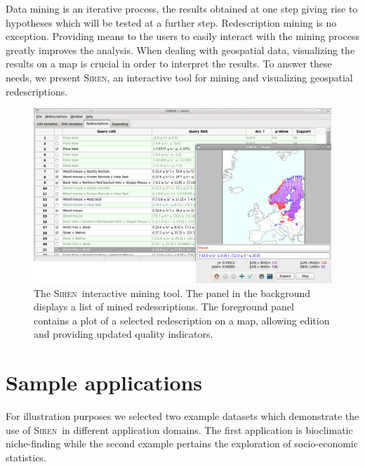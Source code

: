 \documentclass{sig-alternate}
\newcommand{\Siren}{\textsc{Siren}}
\begin{document}
Data mining is an iterative process, the results obtained at one step
giving rise to hypotheses which will be tested at a further step.
Redescription mining is no exception. Providing means to the users to
easily interact with the mining process greatly improves the analysis.
When dealing with geospatial data, visualizing the results on a map is
crucial in order to interpret the results.  To answer these needs, we
present \Siren, an interactive tool for mining and visualizing
geospatial redescriptions.



\begin{figure}[t]
  \centering
\includegraphics[width=\textwidth]{screenshots/both_panels_02.png}
  \caption{The \Siren\ interactive mining tool. The panel in the background displays a list of mined redescriptions. The foreground panel contains a plot of a selected redescription on a map, allowing edition and providing updated quality indicators.}
  \label{fig:both_panels}
\end{figure}

\section{Sample applications}
For illustration purposes we selected two example datasets which
demonstrate the use of \Siren\ in different application domains.  The
first application is bioclimatic niche-finding while the second example
pertains the exploration of socio-economic statistics.
\end{document}
